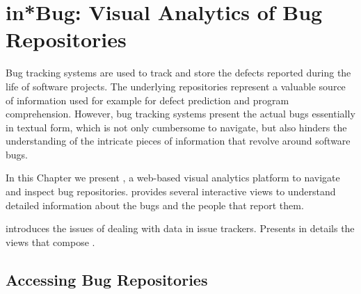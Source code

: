 



\chapter{in*Bug: Visual Analytics of Bug Repositories}\label{ch:visualize}


Bug tracking systems are used to track and store the defects reported during the life of software projects.
The underlying repositories represent a valuable source of information used for example for defect prediction and program comprehension.
However, bug tracking systems present the actual bugs essentially in textual form, which is not only cumbersome to navigate, but also hinders the understanding of the intricate pieces of information that revolve around software bugs.

In this Chapter we present \ib, a web-based visual analytics platform to navigate and inspect bug repositories.
\ib provides several interactive views to understand detailed information about the bugs and the people that report them.


\structure

 introduces the issues of dealing with data in issue trackers.
 Presents in details the views that compose \ib.

\newpage

\section{Accessing Bug Repositories}\label{sec:visualize-intro}

